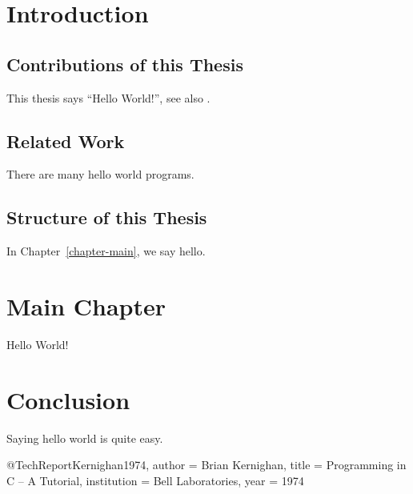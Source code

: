 \documentclass[english, version-2022-01]{uzl-thesis}
\begin{document}
\chapter{Introduction}
\section{Contributions of this Thesis}
This thesis says ``Hello World!'', see also \cite{Kernighan1974}.
\section{Related Work}
There are many hello world programs.
\section{Structure of this Thesis}
In Chapter~\vref{chapter-main}, we say hello.
\chapter{Main Chapter}
\label{chapter-main}
Hello World!
\chapter{Conclusion}
Saying hello world is quite easy.
\begin{bibtex-entries}
@TechReport{Kernighan1974,
	author = {Brian Kernighan},
	title = {Programming in C – A Tutorial},
	institution = {Bell Laboratories},
	year = {1974}
}
\end{bibtex-entries}
\end{document}
